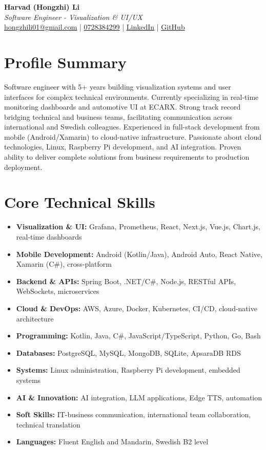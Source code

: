 \documentclass[11pt,a4paper]{article}
\begin{document}
\pagestyle{empty}

\begin{center}
{\LARGE \textbf{Harvad (Hongzhi) Li}}\\[10pt]
{\Large \textit{Software Engineer - Visualization \& UI/UX}}\\[10pt]
\textcolor{linkedinblue}{\href{mailto:hongzhili01@gmail.com}{hongzhili01@gmail.com} | \href{tel:0728384299}{0728384299} | \href{https://www.linkedin.com/in/harvad/}{LinkedIn} | \href{https://github.com/bluehawana}{GitHub}}
\end{center}

\section*{Profile Summary}
Software engineer with 5+ years building visualization systems and user interfaces for complex technical environments. Currently specializing in real-time monitoring dashboards and automotive UI at ECARX. Strong track record bridging technical and business teams, facilitating communication across international and Swedish colleagues. Experienced in full-stack development from mobile (Android/Xamarin) to cloud-native infrastructure. Passionate about cloud technologies, Linux, Raspberry Pi development, and AI integration. Proven ability to deliver complete solutions from business requirements to production deployment.

\section*{Core Technical Skills}
\begin{itemize}[noitemsep]
\item \textbf{Visualization \& UI:} Grafana, Prometheus, React, Next.js, Vue.js, Chart.js, real-time dashboards
\item \textbf{Mobile Development:} Android (Kotlin/Java), Android Auto, React Native, Xamarin (C\#), cross-platform
\item \textbf{Backend \& APIs:} Spring Boot, .NET/C\#, Node.js, RESTful APIs, WebSockets, microservices
\item \textbf{Cloud \& DevOps:} AWS, Azure, Docker, Kubernetes, CI/CD, cloud-native architecture
\item \textbf{Programming:} Kotlin, Java, C\#, JavaScript/TypeScript, Python, Go, Bash
\item \textbf{Databases:} PostgreSQL, MySQL, MongoDB, SQLite, ApsaraDB RDS
\item \textbf{Systems:} Linux administration, Raspberry Pi development, embedded systems
\item \textbf{AI \& Innovation:} AI integration, LLM applications, Edge TTS, automation
\item \textbf{Soft Skills:} IT-business communication, international team collaboration, technical translation
\item \textbf{Languages:} Fluent English and Mandarin, Swedish B2 level
\end{itemize}
\end{document}
